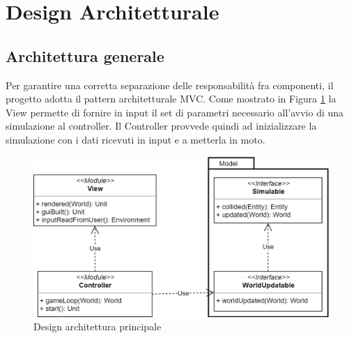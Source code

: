 \section{Design Architetturale}

\subsection{Architettura generale}
Per garantire una corretta separazione delle responsabilità fra componenti, il progetto adotta il pattern architetturale MVC. Come mostrato in Figura \ref{fig:mainarchitecture} la View permette di fornire in input il set di parametri necessario all'avvio di una simulazione al controller. Il Controller provvede quindi ad inizializzare la simulazione con i dati ricevuti in input e a metterla in moto.

\begin{figure}[h!]
\centering
\includegraphics[width=\textwidth, scale=0.44]{img/MainArchitecture.png}
\caption{Design architettura principale}
\label{fig:mainarchitecture}
\end{figure}
